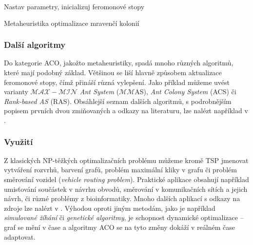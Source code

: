\documentclass[a4paper,12pt]{article}
\begin{document}
\begin{algorithm}[here]
  \DontPrintSemicolon
  \SetAlgoNoLine
  Nastav parametry, inicializuj feromonové stopy\;  
\caption{Metaheuristika optimalizace mravenčí kolonií\label{alg:aco}}
\end{algorithm}




\subsubsection{Další algoritmy}
Do kategorie ACO, jakožto metaheuristiky, spadá mnoho různých algoritmů, které mají podobný základ. Většinou se
liší hlavně způsobem aktualizace feromonové stopy, čímž přináší různá vylepšení. Jako příklad můžeme uvést
varianty {\it $\mathcal{MAX-MIN}$ Ant System} ($\mathcal{MM}$AS), {\it Ant Colony System} (ACS) či
{\it Rank-based AS} (RAS). Obsáhlejší seznam dalších algoritmů, s podrobnějším popisem prvních dvou zmiňovaných
a odkazy na literaturu, lze nalézt například v \cite{Dorigo06antcolony}.





\subsubsection{Využití}
Z klasických NP-těžkých optimalizačních problému můžeme kromě TSP jmenovat vytváření rozvrhů,
barvení grafů, problém maximální kliky v grafu či problém směrování vozidel ({\it vehicle routing problem}).
Praktické aplikace obsahují například
umisťování součástek v návrhu obvodů, směrování v komunikačních sítích a jejich návrh, či různé problémy
z bioinformatiky. Mnoho dalších aplikací s odkazy na zdroje lze nalézt v \cite{Blum08SwarmOpt}.
Výhodou oproti jiným metodám, jako je například {\it simulované žíhání} či {\it genetické algoritmy}, je
schopnost dynamické optimalizace -- graf se mění v čase a algoritmy ACO se na tyto změny dokáží v reálném
čase adaptovat.
\end{document}
